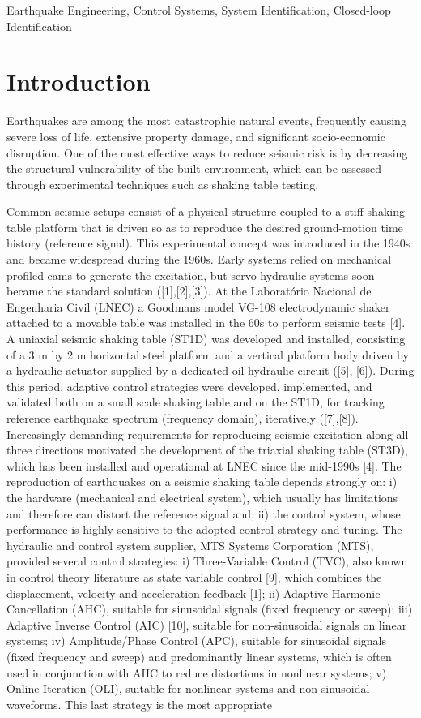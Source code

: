 \documentclass[conference]{IEEEtran}
\begin{document}
 Earthquake Engineering, Control Systems, System Identification, Closed-loop Identification

\section{Introduction} %

Earthquakes are among the most catastrophic natural events, frequently causing severe loss of life, extensive property damage, and significant socio-economic disruption. One of the most effective ways to reduce seismic risk is by decreasing the structural vulnerability of the built environment, which can be assessed through experimental techniques such as shaking table testing. 

Common seismic setups consist of a physical structure coupled to a stiff shaking table platform that is driven so as to reproduce the desired ground-motion time history (reference signal). This experimental concept was introduced in the 1940s and became widespread during the 1960s. Early systems relied on mechanical profiled cams to generate the excitation, but servo-hydraulic systems soon became the standard solution ([1],[2],[3]). At the Laboratório Nacional de Engenharia Civil (LNEC) a Goodmans model VG-108 electrodynamic shaker attached to a movable table was installed in the 60s to perform seismic tests [4]. A uniaxial seismic shaking table (ST1D) was developed and installed, consisting of a 3 m by 2 m horizontal steel platform and a vertical platform body driven by a hydraulic actuator supplied by a dedicated oil-hydraulic circuit ([5], [6]). During this period, adaptive control strategies were developed, implemented, and validated both on a small scale shaking table and on the ST1D, for tracking reference earthquake spectrum (frequency domain), iteratively ([7],[8]). Increasingly demanding requirements for reproducing seismic excitation along all three directions motivated the development of the triaxial shaking table (ST3D), which has been installed and operational at LNEC since the mid-1990s [4]. The reproduction of earthquakes on a seismic shaking table depends strongly on: i) the hardware (mechanical and electrical system), which usually has limitations and therefore can distort the reference signal and; ii) the control system, whose performance is highly sensitive to the adopted control strategy and tuning. The hydraulic and control system supplier, MTS Systems Corporation (MTS), provided several control strategies: i) Three-Variable Control (TVC), also known in control theory literature as state variable control [9], which combines the displacement, velocity and acceleration feedback [1]; ii) Adaptive Harmonic Cancellation (AHC), suitable for sinusoidal signals (fixed frequency or sweep); iii) Adaptive Inverse Control (AIC) [10], suitable for non-sinusoidal signals on linear systems; iv) Amplitude/Phase Control (APC), suitable for sinusoidal signals (fixed frequency and sweep) and predominantly linear systems, which is often used in conjunction with AHC to reduce distortions in nonlinear systems; v) Online Iteration (OLI), suitable for nonlinear systems and non-sinusoidal waveforms. This last strategy is the most appropriate 
\end{document}
